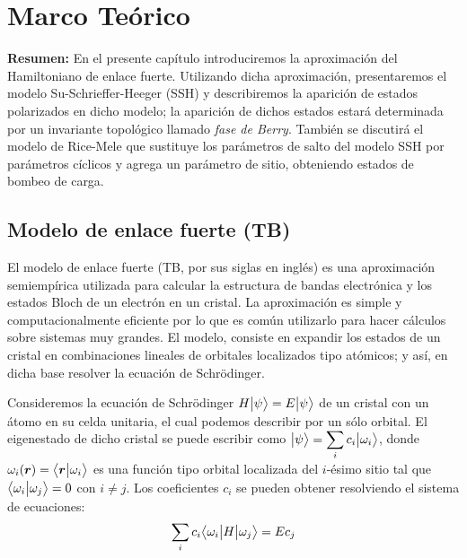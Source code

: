 \chapter{Marco Teórico}

\begin{center}
\begin{minipage}{0.9\textwidth}
{\small
{\bf Resumen:} En el presente capítulo introduciremos la aproximación del Hamiltoniano de enlace fuerte. Utilizando dicha aproximación, presentaremos el modelo Su-Schrieffer-Heeger (SSH) y describiremos la aparición de estados polarizados en dicho modelo; la aparición de dichos estados estará determinada por un invariante topológico llamado \textit{fase de Berry}. También se discutirá el modelo de Rice-Mele que sustituye los parámetros de salto del modelo SSH por parámetros cíclicos y agrega un parámetro de sitio, obteniendo estados de bombeo de carga.
}
\end{minipage}
\end{center}

    
    \section{Modelo de enlace fuerte (TB)}
    El modelo de enlace fuerte (TB, por sus siglas en inglés) es una aproximación semiempírica utilizada para calcular la estructura de bandas electrónica y los estados Bloch de un electrón en un cristal. La aproximación es simple y computacionalmente eficiente por lo que es común utilizarlo para hacer cálculos sobre sistemas muy grandes.
    El modelo, consiste en expandir los estados de un cristal en combinaciones lineales de orbitales localizados tipo atómicos; y así, en dicha base resolver la ecuación de Schrödinger.
    
    Consideremos la ecuación de Schrödinger $H \big |{\psi}\big \rangle = E \big |{\psi}\big \rangle$ de un cristal con un átomo en su celda unitaria, el cual podemos describir por un sólo orbital. El eigenestado de dicho cristal se puede escribir como $\big |{\psi}\big \rangle = \displaystyle 
    \sum_{i} c_i \big |{\omega_i}\big \rangle$, donde $\omega_i(\boldsymbol{r})=\big \langle{\boldsymbol{r}}\big | {\omega_i} \big \rangle$ es una función tipo orbital localizada del $i$-ésimo sitio tal que $\big \langle{\omega_i}\big | {\omega_j} \big \rangle = 0$  con $i \neq j$. Los coeficientes $c_i$ se pueden obtener resolviendo el sistema de ecuaciones:
    \begin{equation} 
        \label{eq:Hopping_no_ortogonal}
        \sum_i c_i \big \langle{\omega_i}\big | {H} \big | {\omega_j} \big \rangle = E c_j
    \end{equation}
    
